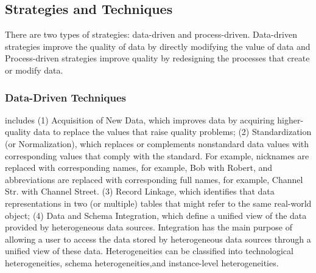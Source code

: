 \documentclass[pdftex,english,oribibl]{llncs}
\begin{document}
\subsection{Strategies and Techniques}
There are two types of strategies: data-driven and process-driven. Data-driven strategies improve the quality of data by directly modifying the value of data and Process-driven strategies improve quality by redesigning the processes that create or modify data.

\subsubsection{Data-Driven Techniques}
includes
(1) Acquisition of New Data, which improves data by acquiring higher-quality data to replace the values that raise quality problems;
(2) Standardization (or Normalization), which replaces or complements nonstandard data values with corresponding values that comply with the standard. For example, nicknames are replaced with corresponding names, for example, Bob with Robert, and abbreviations are replaced with corresponding full names, for example, Channel Str. with Channel Street.
(3) Record Linkage, which identifies that data representations in two (or multiple) tables that might refer to the same real-world object;
(4) Data and Schema Integration, which define a unified view of the data provided by heterogeneous data sources. Integration has the main purpose of allowing a user to access the data stored by heterogeneous data sources through a unified view of these data. Heterogeneities can be classified into technological heterogeneities, schema heterogeneities,and instance-level heterogeneities.
\begin{comment}
In distributed, cooperative, and P2P information systems (see Section 2.6), data sources are characterized by various kinds of heterogeneities that can be generally classified into (1) technological heterogeneities, (2) schema heterogeneities, and (3) instance-level heterogeneities.
Technological heterogeneities are due to the use of products by different vendors, employed at various layers of an information and communication infrastructure.
Schema heterogeneities are primarily caused by the use of (1) different data models, as in the case of a source that adopts the relational data model and a different source that adopts the XML data model, and (2) different representations for the same object, such as two relational sources that represent an object as a table and an attribute. Instance-level heterogeneities are caused by different, conflicting data values provided by distinct sources for the same objects. For instance, this type of heterogeneity can be caused by independent and poorly coordinated processes that feed the different data sources.
Data integration must face all the types of these listed heterogeneities.
\end{comment}
\end{document}
